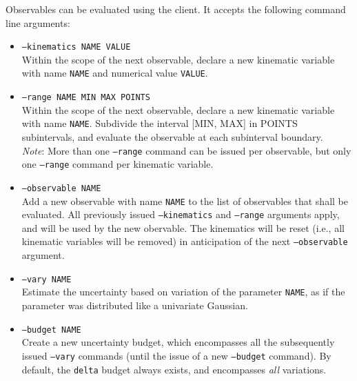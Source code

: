 Observables can be evaluated using the  client. It accepts
the following command line arguments:
\begin{itemize}
    \item[] \texttt{--kinematics NAME VALUE}\\[\medskipamount]
        Within the scope of the next observable, declare a new kinematic
        variable with name \texttt{NAME} and numerical value \texttt{VALUE}.

    \item[] \texttt{--range NAME MIN MAX POINTS}\\[\medskipamount]
        Within the scope of the next observable, declare a new kinematic
        variable with name \texttt{NAME}. Subdivide the interval [MIN, MAX]
        in POINTS subintervals, and evaluate the observable at each subinterval
        boundary.\\

        \emph{Note}: More than one \texttt{--range} command can be issued per
        observable, but only one \texttt{--range} command per kinematic variable.

    \item[] \texttt{--observable NAME}\\[\medskipamount]
        Add a new observable with name \texttt{NAME} to the list of observables
        that shall be evaluated. All previously issued \texttt{--kinematics}
        and \texttt{--range} arguments apply, and will be used by the new obervable.
        The kinematics will be reset (i.e., all kinematic variables will be removed)
        in anticipation of the next \texttt{--observable} argument.

    \item[] \texttt{--vary NAME}\\[\medskipamount]
        Estimate the uncertainty based on variation of the parameter \texttt{NAME},
        as if the parameter was distributed like a univariate Gaussian.

    \item[] \texttt{--budget NAME}\\[\medskipamount]
        Create a new uncertainty budget, which encompasses all the subsequently issued
        \texttt{--vary} commands (until the issue of a new \texttt{--budget} command).
        By default, the \texttt{delta} budget always exists, and encompasses \emph{all}
        variations.
\end{itemize}

